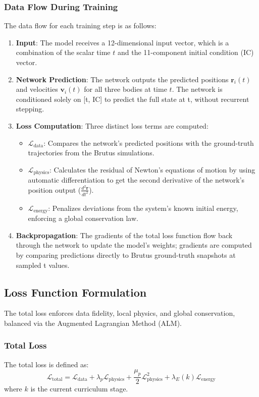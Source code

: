 \documentclass{article}
\begin{document}
\subsubsection{Data Flow During Training}
The data flow for each training step is as follows:
\begin{enumerate}
    \item \textbf{Input}: The model receives a 12-dimensional input vector, which is a combination of the scalar time $t$ and the 11-component initial condition (IC) vector.
    \item \textbf{Network Prediction}: The network outputs the predicted positions $\mathbf{r}_i(t)$ and velocities $\mathbf{v}_i(t)$ for all three bodies at time $t$. The network is conditioned solely on [t, IC] to predict the full state at t, without recurrent stepping.
    \item \textbf{Loss Computation}: Three distinct loss terms are computed:
    \begin{itemize}
        \item $\mathcal{L}_{\text{data}}$: Compares the network's predicted positions with the ground-truth trajectories from the Brutus simulations.
        \item $\mathcal{L}_{\text{physics}}$: Calculates the residual of Newton's equations of motion by using automatic differentiation to get the second derivative of the network's position output ($\frac{d^2\mathbf{r}}{dt^2}$).
        \item $\mathcal{L}_{\text{energy}}$: Penalizes deviations from the system's known initial energy, enforcing a global conservation law.
    \end{itemize}
    \item \textbf{Backpropagation}: The gradients of the total loss function flow back through the network to update the model's weights; gradients are computed by comparing predictions directly to Brutus ground-truth snapshots at sampled t values.
\end{enumerate}

\subsection{Loss Function Formulation}

The total loss enforces data fidelity, local physics, and global conservation, balanced via the Augmented Lagrangian Method (ALM).

\subsubsection*{Total Loss}
The total loss is defined as:
\begin{equation}
\mathcal{L}_{\text{total}} = \mathcal{L}_{\text{data}} + \lambda_{p}\mathcal{L}_{\text{physics}} + \frac{\mu_{p}}{2}\mathcal{L}_{\text{physics}}^{2} + \lambda_{E}(k)\mathcal{L}_{\text{energy}}
\end{equation}
where $k$ is the current curriculum stage.
\end{document}

